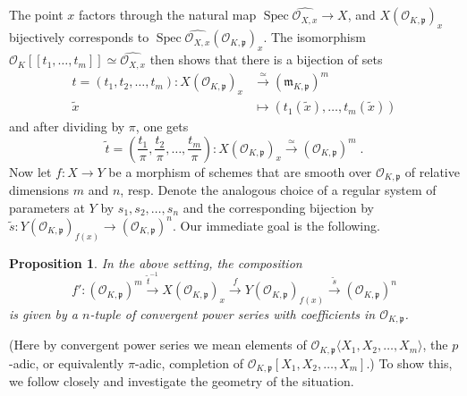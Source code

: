 \documentclass[11pt,oneside]{amsart}
\theoremstyle{plain}
\newtheorem{proposition}[theorem]{Proposition}
\theoremstyle{definition}
\DeclareMathOperator{\spec}{Spec} \DeclareMathOperator{\sgn}{sign}
\def\oh{\mathcal{O}}
\begin{document}
The point $x$ factors through the natural map $\spec{\widehat{\oh_{X, x}}} \rightarrow X$, and $X(\oh_{K, \mathfrak{p}})_x$ bijectively corresponds to $\spec{\widehat{\oh_{X, x}}}(\oh_{K,\mathfrak{p}})_x$. The isomorphism $  \oh_K[[t_1, \dots, t_m]]\simeq \widehat{\oh_{X, x}}$ then shows that there is a bijection of sets
\begin{align*}t=(t_1, t_2, \dots, t_m):X(\oh_{K, \mathfrak{p}})_x &\stackrel{\simeq}{\longrightarrow}  (\mathfrak{m}_{K, \mathfrak{p}})^{m} \\ 
\tilde{x}\;\; &\longmapsto  (t_1(\tilde{x}), \dots, t_m(\tilde{x}))
\end{align*}  
and after dividing by $\pi$, one gets
\begin{equation} \label{eq:tilde_t} \tilde{t}=\left(\frac{t_1}{\pi}, \frac{t_2}{\pi}, \dots, \frac{t_m}{\pi}\right):X(\oh_{K, \mathfrak{p}})_x \stackrel{\simeq}{\longrightarrow}  (\oh_{K, \mathfrak{p}})^{m}\;.
\end{equation} 
Now let $f: X \rightarrow Y$ be a morphism of schemes that are smooth over $\oh_{K, \mathfrak{p}}$ of relative dimensions $m$ and $n$, resp. Denote the analogous choice of a regular system of parameters at $Y$ by $s_1, s_2, \dots, s_{n}$ and the corresponding bijection by $\tilde{s}: Y(\oh_{K, \mathfrak{p}})_{f(x)} \rightarrow (\oh_{K, \mathfrak{p}})^{n}$. Our immediate goal is the following.

\begin{proposition}\label{prop:blowup}
In the above setting, the composition $$f':(\oh_{K, \mathfrak{p}})^m\stackrel{\tilde{t}^{-1}}{\longrightarrow} X(\oh_{K, \mathfrak{p}})_x \stackrel{f}{\longrightarrow} Y(\oh_{K, \mathfrak{p}})_{f(x)} \stackrel{\tilde{s}}{\longrightarrow}(\oh_{K, \mathfrak{p}})^{n}$$
is given by a $n$-tuple of convergent power series with coefficients in $\oh_{K, \mathfrak{p}}$.
\end{proposition}

(Here by convergent power series we mean elements of $\oh_{K, \mathfrak{p}}\langle X_1, X_2, \dots, X_m\rangle$, the $p$-adic, or equivalently $\pi$-adic, completion of $\oh_{K, \mathfrak{p}}[X_1, X_2, \dots, X_m]$.) To show this, we follow closely \cite[\S 3]{EL19} and investigate the geometry of the situation.
\end{document}
